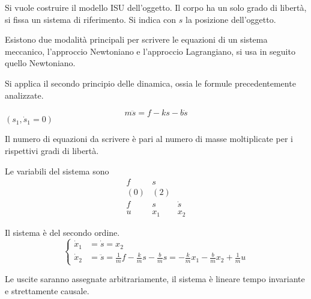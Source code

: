Si vuole costruire il modello ISU dell'oggetto.
Il corpo ha un solo grado di libertà, si fissa un sistema di riferimento.
Si indica con $s$ la posizione dell'oggetto.

Esistono due modalità principali per scrivere le equazioni di un sistema
meccanico, l'approccio Newtoniano e l'approccio Lagrangiano, si usa in seguito
quello Newtoniano.

Si applica il secondo principio delle dinamica, ossia le formule
precedentemente analizzate.

$$
m\ddot{s} = f - ks - b\dot{s}
$$
$(s_1 , \dot{s}_1 = 0)$

Il numero di equazioni da scrivere è pari al numero di masse moltiplicate per i
rispettivi gradi di libertà.

Le variabili del sistema sono
$$\begin{matrix}
f & s \\
(0) & (2) \\
f & s & \dot{s}\\
u & x_1 &x_2
\end{matrix}$$

Il sistema è del secondo ordine.
$$\left\{\begin{aligned}
\dot{x}_1 &= \dot{s} = x_2 \\
\dot{x}_2 &= \ddot{s} = \frac{1}{m}f - \frac{k}{m}s - \frac{b}{m}s =
-\frac{k}{m}x_1 - \frac{b}{m}x_2 + \frac{1}{m}u
\end{aligned}\right.$$

Le uscite saranno assegnate arbitrariamente, il sistema è lineare
tempo invariante e strettamente causale.
